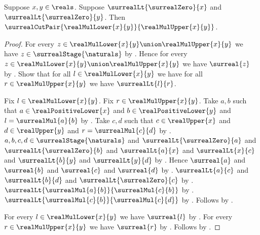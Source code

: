 \begin{proposition}\label{surreal_real_mul_cut_pair}
    Suppose $x,y\in\reals$.
    Suppose $\surrealLt{\surrealZero}{x}$ and
        $\surrealLt{\surrealZero}{y}$.
    Then $\surrealCutPair{\realMulLower{x}{y}}
        {\realMulUpper{x}{y}}$.
\end{proposition}
\begin{proof}
    For every $z\in\realMulLower{x}{y}\union
        \realMulUpper{x}{y}$ we have
        $z\in\surrealStage{\naturals}$
        by
        .
    Hence for every $z\in\realMulLower{x}{y}\union
        \realMulUpper{x}{y}$ we have $\surreal{z}$
        by
        .
    Show that for all $l\in\realMulLower{x}{y}$ we have for all
        $r\in\realMulUpper{x}{y}$ we have $\surrealLt{l}{r}$.
    \begin{subproof}
        Fix $l\in\realMulLower{x}{y}$.
        Fix $r\in\realMulUpper{x}{y}$.
        Take $a,b$ such that
            $a\in\realPositiveLower{x}$ and
            $b\in\realPositiveLower{y}$ and
            $l=\surrealMul{a}{b}$
            by .
        Take $c,d$ such that
            $c\in\realUpper{x}$ and $d\in\realUpper{y}$ and
            $r=\surrealMul{c}{d}$
            by .
        $a,b,c,d\in\surrealStage{\naturals}$ and
            $\surrealLt{\surrealZero}{a}$ and
            $\surrealLt{\surrealZero}{b}$ and
            $\surrealLt{a}{x}$ and $\surrealLt{x}{c}$ and
            $\surrealLt{b}{y}$ and $\surrealLt{y}{d}$
            by
            .
        Hence $\surreal{a}$ and $\surreal{b}$ and
            $\surreal{c}$ and $\surreal{d}$
            by
            .
        $\surrealLt{a}{c}$ and $\surrealLt{b}{d}$ and
            $\surrealLt{\surrealZero}{c}$
            by
            .
        $\surrealLt{\surrealMul{a}{b}}{\surrealMul{c}{b}}$
            by .
        $\surrealLt{\surrealMul{c}{b}}{\surrealMul{c}{d}}$
            by .
        Follows by
            .
    \end{subproof}
    For every $l\in\realMulLower{x}{y}$ we have $\surreal{l}$
        by .
    For every $r\in\realMulUpper{x}{y}$ we have $\surreal{r}$
        by .
    Follows by .
\end{proof}

